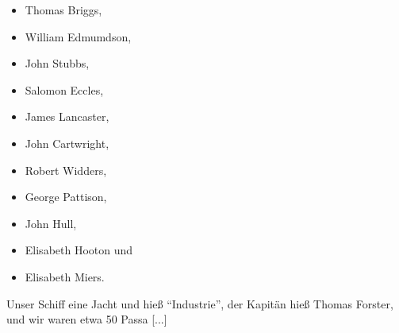 \begin{itemize}
 \item Thomas Briggs,
 \item William Edmumdson, 
 \item John Stubbs, 
 \item Salomon Eccles, 
 \item James Lancaster, 
 \item John Cartwright, 
 \item Robert Widders, 
 \item George Pattison,
 \item John Hull, 
 \item Elisabeth Hooton und 
 \item Elisabeth Miers.
\end{itemize}

Unser Schiff eine Jacht und hieß "`Industrie"', der Kapitän hieß Thomas
Forster, und wir waren etwa 50 Passa [...]

